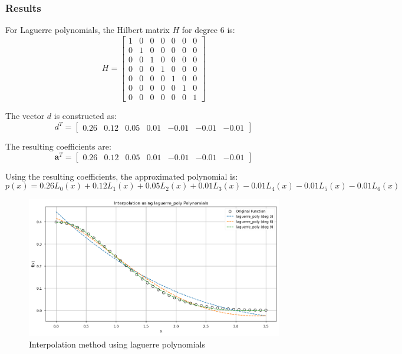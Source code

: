 \documentclass[10pt]{article}
\begin{document}
\subsubsection{Results}

For Laguerre polynomials, the Hilbert matrix \( H \) for degree 6 is:
\[
H = \begin{bmatrix}
1 & 0 & 0 & 0 & 0 & 0 & 0 \\
0 & 1 & 0 & 0 & 0 & 0 & 0 \\
0 & 0 & 1 & 0 & 0 & 0 & 0 \\
0 & 0 & 0 & 1 & 0 & 0 & 0 \\
0 & 0 & 0 & 0 & 1 & 0 & 0 \\
0 & 0 & 0 & 0 & 0 & 1 & 0 \\
0 & 0 & 0 & 0 & 0 & 0 & 1
\end{bmatrix}
\]

The vector \( d \) is constructed as:
\[
d^T = \begin{bmatrix}
0.26 & 0.12 & 0.05 & 0.01 & -0.01 & -0.01 & -0.01
\end{bmatrix}
\]

The resulting coefficients are:
\[
\mathbf{a}^T = \begin{bmatrix}
0.26 & 0.12 & 0.05 & 0.01 & -0.01 & -0.01 & -0.01
\end{bmatrix}
\]

Using the resulting coefficients, the approximated polynomial is:
\begin{equation}
p(x) = 0.26 L_0(x) + 0.12 L_1(x) + 0.05 L_2(x) + 0.01 L_3(x) - 0.01 L_4(x) - 0.01 L_5(x) - 0.01 L_6(x)
\end{equation}


\begin{figure}[H]
    \centering
    \includegraphics[width=\imagewidth\textwidth]{figures/02_interpolation/interpolation_method_laguerre_poly.png}
    \caption{Interpolation method using laguerre polynomials}
\end{figure}
\end{document}
